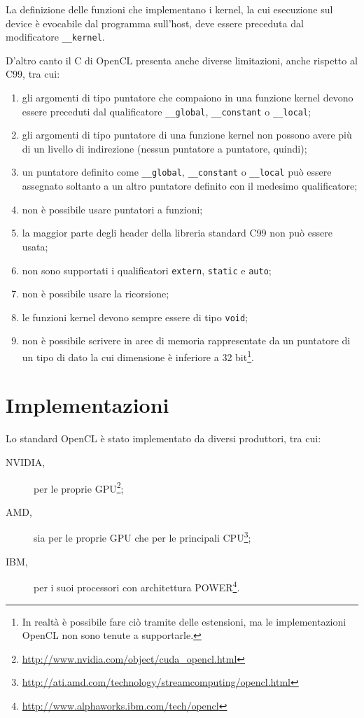 \documentclass[12pt,a4paper,oneside]{book}
\begin{document}
La definizione delle funzioni che implementano i kernel, la cui esecuzione sul device è evocabile dal programma sull'host, deve essere preceduta dal modificatore \verb|__kernel|.

D'altro canto il C di OpenCL presenta anche diverse limitazioni, anche rispetto al C99, tra cui:
\begin{enumerate}
\item gli argomenti di tipo puntatore che compaiono in una funzione kernel devono essere preceduti dal qualificatore \verb|__global|, \verb|__constant| o \verb|__local|;
\item gli argomenti di tipo puntatore di una funzione kernel non possono avere più di un livello di indirezione (nessun puntatore a puntatore, quindi);
\item un puntatore definito come \verb|__global|, \verb|__constant| o \verb|__local| può essere assegnato soltanto a un altro puntatore definito con il medesimo qualificatore;
\item non è possibile usare puntatori a funzioni;
\item la maggior parte degli header della libreria standard C99 non può essere usata;
\item non sono supportati i qualificatori \verb|extern|, \verb|static| e \verb|auto|;
\item non è possibile usare la ricorsione;
\item le funzioni kernel devono sempre essere di tipo \verb|void|;
\item non è possibile scrivere in aree di memoria rappresentate da un puntatore di un tipo di dato la cui dimensione è inferiore a 32 bit\footnote{In realtà è possibile fare ciò tramite delle estensioni, ma le implementazioni \ac{OpenCL} non sono tenute a supportarle.}.
\end{enumerate}

\section{Implementazioni}
\label{sec:opencl-impl}

Lo standard \ac{OpenCL} è stato implementato da diversi produttori, tra cui:
\begin{description}
\item[NVIDIA,] per le proprie \ac{GPU}\footnote{\url{http://www.nvidia.com/object/cuda_opencl.html}};
\item[AMD,] sia per le proprie \ac{GPU} che per le principali \ac{CPU}\footnote{\url{http://ati.amd.com/technology/streamcomputing/opencl.html}};
\item[IBM,] per i suoi processori con architettura POWER\footnote{\url{http://www.alphaworks.ibm.com/tech/opencl}}.
\end{description}
\end{document}
